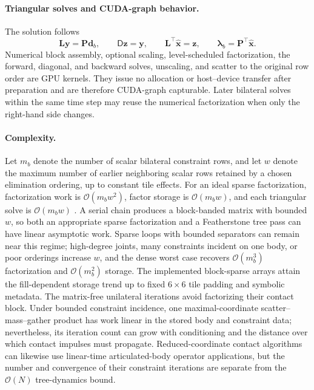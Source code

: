 \documentclass{article}
\newcommand{\Perm}{\mathbf{P}}        %
\newcommand{\Lfac}{\mathbf{L}}        %
\newcommand{\Dfac}{\mathsf{D}}         %
\newcommand{\blam}{\boldsymbol{\lambda}}
\theoremstyle{plain}
\theoremstyle{definition}
\begin{document}
\paragraph{Triangular solves and CUDA-graph behavior.}
The solution follows
\begin{equation}
  \Lfac\mathbf y=\Perm\mathbf d_b,\qquad
  \Dfac\mathbf z=\mathbf y,\qquad
  \Lfac^\top\widehat{\mathbf x}=\mathbf z,\qquad
  \blam_b=\Perm^\top\widehat{\mathbf x}.
  \label{eq:ldl-solves}
\end{equation}
Numerical block assembly, optional scaling, level-scheduled factorization, the
forward, diagonal, and backward solves, unscaling, and scatter to the original
row order are GPU kernels. They issue no allocation or host--device transfer
after preparation and are therefore CUDA-graph capturable. Later bilateral
solves within the same time step may reuse the numerical factorization when
only the right-hand side changes.

\paragraph{Complexity.}
Let $m_b$ denote the number of scalar bilateral constraint rows, and let $w$
denote the maximum number of earlier neighboring scalar rows retained by a
chosen elimination ordering, up to constant tile effects. For an ideal sparse
factorization, factorization work is $\mathcal O(m_b w^2)$, factor storage is
$\mathcal O(m_b w)$, and each triangular solve is $\mathcal O(m_b w)$
\cite{davis2006}. A serial chain produces a block-banded matrix with bounded
$w$, so both an appropriate sparse factorization and a Featherstone tree pass
can have linear asymptotic work. Sparse loops with bounded separators can remain
near this regime; high-degree joints, many constraints incident on one body, or
poor orderings increase $w$, and the dense worst case recovers
$\mathcal O(m_b^3)$ factorization and $\mathcal O(m_b^2)$ storage. The
implemented block-sparse arrays attain the fill-dependent storage trend up to
fixed $6\times6$ tile padding and symbolic metadata. The matrix-free unilateral
iterations avoid factorizing their contact block. Under bounded constraint
incidence, one maximal-coordinate scatter--mass--gather product has work linear
in the stored body and constraint data; nevertheless, its iteration count can
grow with conditioning and the distance over which contact impulses must
propagate. Reduced-coordinate contact algorithms can likewise use linear-time
articulated-body operator applications, but the number and convergence of their
constraint iterations are separate from the $\mathcal O(N)$ tree-dynamics bound.
\end{document}
